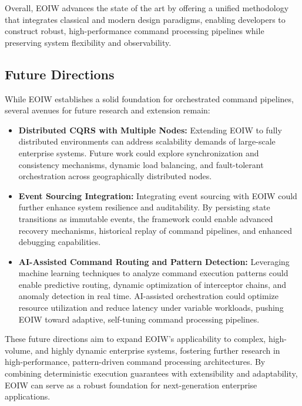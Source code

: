 Overall, EOIW advances the state of the art by offering a unified methodology that integrates classical and modern design paradigms, enabling developers to construct robust, high-performance command processing pipelines while preserving system flexibility and observability.

\subsection{Future Directions}

While EOIW establishes a solid foundation for orchestrated command pipelines, several avenues for future research and extension remain:

\begin{itemize}
    \item \textbf{Distributed CQRS with Multiple Nodes:} Extending EOIW to fully distributed environments can address scalability demands of large-scale enterprise systems. Future work could explore synchronization and consistency mechanisms, dynamic load balancing, and fault-tolerant orchestration across geographically distributed nodes.
    
    \item \textbf{Event Sourcing Integration:} Integrating event sourcing with EOIW could further enhance system resilience and auditability. By persisting state transitions as immutable events, the framework could enable advanced recovery mechanisms, historical replay of command pipelines, and enhanced debugging capabilities.
    
    \item \textbf{AI-Assisted Command Routing and Pattern Detection:} Leveraging machine learning techniques to analyze command execution patterns could enable predictive routing, dynamic optimization of interceptor chains, and anomaly detection in real time.  AI-assisted orchestration could optimize resource utilization and reduce latency under variable workloads, pushing EOIW toward adaptive, self-tuning command processing pipelines. 
\end{itemize}

These future directions aim to expand EOIW’s applicability to complex, high-volume, and highly dynamic enterprise systems, fostering further research in high-performance, pattern-driven command processing architectures. By combining deterministic execution guarantees with extensibility and adaptability, EOIW can serve as a robust foundation for next-generation enterprise applications.

